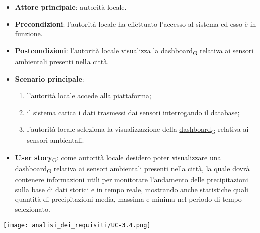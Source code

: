 \begin{itemize}
	\item \textbf{Attore principale}: autorità locale.
	\item \textbf{Precondizioni}: l'autorità locale ha effettuato l'accesso al sistema ed esso è in funzione.
	\item \textbf{Postcondizioni}: l'autorità locale visualizza la \href{https://7last.github.io/docs/pb/documentazione-interna/glossario\#dashboard}{dashboard\textsubscript{G}} relativa
	      ai sensori ambientali presenti nella città.
	\item \textbf{Scenario principale}:
	      \begin{enumerate}
		      \item l'autorità locale accede alla piattaforma;
		      \item il sistema carica i dati trasmessi dai sensori interrogando il database;
		      \item l'autorità locale seleziona la visualizzazione della \href{https://7last.github.io/docs/pb/documentazione-interna/glossario\#dashboard}{dashboard\textsubscript{G}} relativa ai sensori ambientali.
	      \end{enumerate}
	\item \href{https://7last.github.io/docs/pb/documentazione-interna/glossario\#user-story}{\textbf{User story}\textsubscript{G}}:
	      come autorità locale desidero poter visualizzare una \href{https://7last.github.io/docs/pb/documentazione-interna/glossario\#dashboard}{dashboard\textsubscript{G}} relativa ai sensori ambientali presenti nella città, la quale
	      dovrà contenere informazioni utili per monitorare l'andamento delle precipitazioni sulla base di dati storici e in tempo reale, mostrando
	      anche statistiche quali quantità di precipitazioni media, massima e minima nel periodo di tempo selezionato.
\end{itemize}
\begin{center}
	\texttt{[image: analisi\_dei\_requisiti/UC-3.4.png]}
\end{center}


